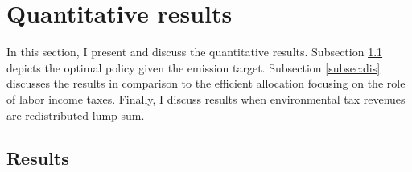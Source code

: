 \section{Quantitative results}\label{sec:res}

In this section, I present and discuss the quantitative results.
Subsection \ref{subsec:mr} depicts the optimal policy given the emission target. Subsection \ref{subsec:dis} discusses the results in comparison to the efficient allocation focusing on the role of labor income taxes. Finally, I discuss results when environmental tax revenues are redistributed lump-sum. 


\subsection{Results}\label{subsec:mr}


